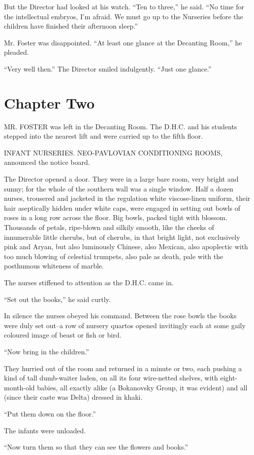 \documentclass[12pt]{report}
\newcommand{\mychapter}[2]{
\setcounter{chapter}{#1}
    \setcounter{section}{0}
    \chapter*{#2}
    \addcontentsline{toc}{chapter}{#2}
}
\begin{document}
But the Director had looked at his watch. ``Ten to three,'' he said.
``No time for the intellectual embryos, I'm afraid. We must go up to the
Nurseries before the children have finished their afternoon sleep.''

Mr. Foster was disappointed. ``At least one glance at the Decanting
Room,'' he pleaded.

``Very well then.'' The Director smiled indulgently. ``Just one
glance.''
\mychapter{2}{Chapter Two}
MR. FOSTER was left in the Decanting Room. The D.H.C. and his students
stepped into the nearest lift and were carried up to the fifth floor.

{\selectfont INFANT NURSERIES. NEO-PAVLOVIAN CONDITIONING ROOMS,} announced the notice
board.

The Director opened a door. They were in a large bare room, very bright
and sunny; for the whole of the southern wall was a single window. Half
a dozen nurses, trousered and jacketed in the regulation white
viscose-linen uniform, their hair aseptically hidden under white caps,
were engaged in setting out bowls of roses in a long row across the
floor. Big bowls, packed tight with blossom. Thousands of petals,
ripe-blown and silkily smooth, like the cheeks of innumerable little
cherubs, but of cherubs, in that bright light, not exclusively pink and
Aryan, but also luminously Chinese, also Mexican, also apoplectic with
too much blowing of celestial trumpets, also pale as death, pale with
the posthumous whiteness of marble.

The nurses stiffened to attention as the D.H.C. came in.

``Set out the books,'' he said curtly.

In silence the nurses obeyed his command. Between the rose bowls the
books were duly set out--a row of nursery quartos opened invitingly each
at some gaily coloured image of beast or fish or bird.

``Now bring in the children.''

They hurried out of the room and returned in a minute or two, each
pushing a kind of tall dumb-waiter laden, on all its four wire-netted
shelves, with eight-month-old babies, all exactly alike (a Bokanovsky
Group, it was evident) and all (since their caste was Delta) dressed in
khaki.

``Put them down on the floor.''

The infants were unloaded.

``Now turn them so that they can see the flowers and books.''
\end{document}
